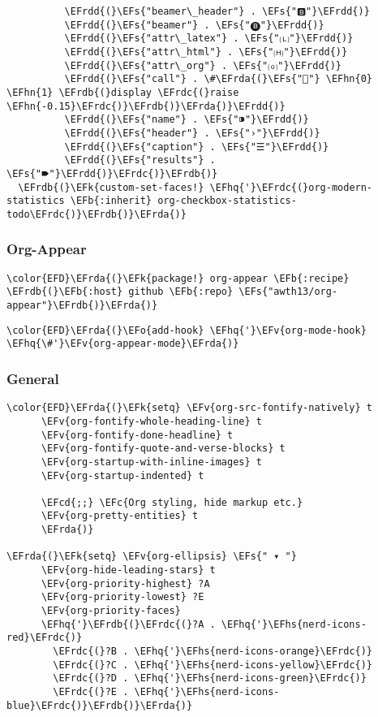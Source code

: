 \documentclass[12pt]{article}
\theoremstyle{plain}%
\theoremstyle{definition}
\theoremstyle{remark}
\newcommand{\EFc}[1]{\textcolor{EFc}{#1}} %
\newcommand{\EFcd}[1]{\textcolor{EFcd}{#1}} %
\newcommand{\EFs}[1]{\textcolor{EFs}{#1}} %
\newcommand{\EFk}[1]{\textcolor{EFk}{#1}} %
\newcommand{\EFb}[1]{\textcolor{EFb}{#1}} %
\newcommand{\EFv}[1]{\textcolor{EFv}{#1}} %
\newcommand{\EFo}[1]{\textcolor{EFo}{#1}} %
\newcommand{\EFhn}[1]{\textcolor{EFhn}{\textbf{#1}}} %
\newcommand{\EFhq}[1]{\textcolor{EFhq}{#1}} %
\newcommand{\EFhs}[1]{\textcolor{EFhs}{#1}} %
\newcommand{\EFrda}[1]{\textcolor{EFrda}{#1}} %
\newcommand{\EFrdb}[1]{\textcolor{EFrdb}{#1}} %
\newcommand{\EFrdc}[1]{\textcolor{EFrdc}{#1}} %
\newcommand{\EFrdd}[1]{\textcolor{EFrdd}{#1}} %
\begin{document}
\begin{Code}
\begin{Verbatim}
          \EFrdd{(}\EFs{"beamer\_header"} . \EFs{"🅱"}\EFrdd{)}
          \EFrdd{(}\EFs{"beamer"} . \EFs{"🅑"}\EFrdd{)}
          \EFrdd{(}\EFs{"attr\_latex"} . \EFs{"🄛"}\EFrdd{)}
          \EFrdd{(}\EFs{"attr\_html"} . \EFs{"🄗"}\EFrdd{)}
          \EFrdd{(}\EFs{"attr\_org"} . \EFs{"⒪"}\EFrdd{)}
          \EFrdd{(}\EFs{"call"} . \#\EFrda{(}\EFs{""} \EFhn{0} \EFhn{1} \EFrdb{(}display \EFrdc{(}raise \EFhn{-0.15}\EFrdc{)}\EFrdb{)}\EFrda{)}\EFrdd{)}
          \EFrdd{(}\EFs{"name"} . \EFs{"⁍"}\EFrdd{)}
          \EFrdd{(}\EFs{"header"} . \EFs{"›"}\EFrdd{)}
          \EFrdd{(}\EFs{"caption"} . \EFs{"☰"}\EFrdd{)}
          \EFrdd{(}\EFs{"results"} . \EFs{"🠶"}\EFrdd{)}\EFrdc{)}\EFrdb{)}
  \EFrdb{(}\EFk{custom-set-faces!} \EFhq{'}\EFrdc{(}org-modern-statistics \EFb{:inherit} org-checkbox-statistics-todo\EFrdc{)}\EFrdb{)}\EFrda{)}
\end{Verbatim}
\end{Code}
\subsubsection{Org-Appear}
\label{sec:orgc4eacfe}
\begin{Code}
\begin{Verbatim}
\color{EFD}\EFrda{(}\EFk{package!} org-appear \EFb{:recipe} \EFrdb{(}\EFb{:host} github \EFb{:repo} \EFs{"awth13/org-appear"}\EFrdb{)}\EFrda{)}
\end{Verbatim}
\end{Code}
\begin{Code}
\begin{Verbatim}
\color{EFD}\EFrda{(}\EFo{add-hook} \EFhq{'}\EFv{org-mode-hook} \EFhq{\#'}\EFv{org-appear-mode}\EFrda{)}
\end{Verbatim}
\end{Code}
\subsubsection{General}
\label{sec:org3b8abb6}
\begin{Code}
\begin{Verbatim}
\color{EFD}\EFrda{(}\EFk{setq} \EFv{org-src-fontify-natively} t
      \EFv{org-fontify-whole-heading-line} t
      \EFv{org-fontify-done-headline} t
      \EFv{org-fontify-quote-and-verse-blocks} t
      \EFv{org-startup-with-inline-images} t
      \EFv{org-startup-indented} t

      \EFcd{;;} \EFc{Org styling, hide markup etc.}
      \EFv{org-pretty-entities} t
      \EFrda{)}

\EFrda{(}\EFk{setq} \EFv{org-ellipsis} \EFs{" ▾ "}
      \EFv{org-hide-leading-stars} t
      \EFv{org-priority-highest} ?A
      \EFv{org-priority-lowest} ?E
      \EFv{org-priority-faces}
      \EFhq{'}\EFrdb{(}\EFrdc{(}?A . \EFhq{'}\EFhs{nerd-icons-red}\EFrdc{)}
        \EFrdc{(}?B . \EFhq{'}\EFhs{nerd-icons-orange}\EFrdc{)}
        \EFrdc{(}?C . \EFhq{'}\EFhs{nerd-icons-yellow}\EFrdc{)}
        \EFrdc{(}?D . \EFhq{'}\EFhs{nerd-icons-green}\EFrdc{)}
        \EFrdc{(}?E . \EFhq{'}\EFhs{nerd-icons-blue}\EFrdc{)}\EFrdb{)}\EFrda{)}
\end{Verbatim}
\end{Code}
\end{document}

